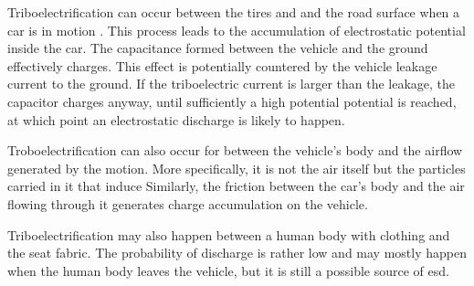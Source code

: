 Triboelectrification can occur between the tires and and the road surface when a car is in motion \cite{generationESDautomotive}.
This process leads to the accumulation of electrostatic potential inside the car.
The capacitance formed between the vehicle and the ground effectively charges.
This effect is potentially countered by the vehicle leakage current to the ground.
If the triboelectric current is larger than the leakage, the capacitor charges anyway, until sufficiently a high potential potential is reached, at which point an electrostatic discharge is likely to happen.

Troboelectrification can also occur for between the vehicle's body and the airflow generated by the motion.
More specifically, it is not the air itself but the particles carried in it that induce
Similarly, the friction between the car's body and the air flowing through it generates charge accumulation on the vehicle.

Triboelectrification may also happen between a human body with clothing and the seat fabric.
The probability of discharge is rather low \cite{generationESDautomotive} and may mostly happen when the human body leaves the vehicle, but it is still a possible source of \gls{esd}.
